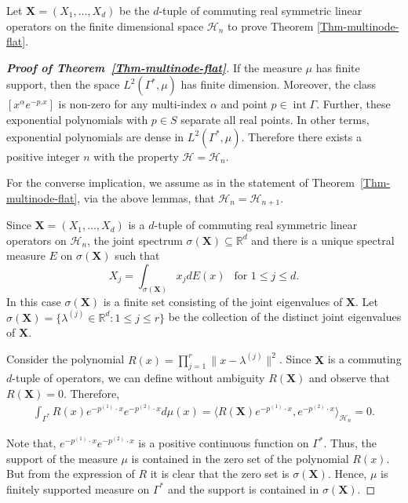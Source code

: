 \documentclass[11pt,reqno]{amsart}
\theoremstyle{plain}
\theoremstyle{definition}
\numberwithin{equation}{section}
\begin{document}
	Let $\mathbf{X}=(X_1, \dots, X_d)$ be the $d$-tuple of commuting real symmetric linear operators on the finite dimensional space $\mathcal{H}_n$ to prove Theorem \ref{Thm-multinode-flat}.
	
	\vspace{2mm}
	
	\begin{proof}[\textbf{Proof of Theorem~\ref{Thm-multinode-flat}}]
		
		If the measure $\mu$ has finite support, then the space $L^2(\Gamma^*, \mu)$ has finite dimension. Moreover, the class $[x^\alpha e^{-p.x}]$ is non-zero for any multi-index $\alpha$
		and point $p \in \operatorname{int} \Gamma$. Further, these exponential polynomials with $p \in S$ separate all real points. In other terms, exponential polynomials are dense in $L^2(\Gamma^\ast, \mu)$.
	Therefore there exists a positive integer $n$ with the property $\mathcal{H} = \mathcal{H}_n.$
          
		For the converse implication, we assume as in the statement of Theorem~\ref{Thm-multinode-flat}, via the above lemmas, that $\mathcal{H}_n = \mathcal{H}_{n+1}.$
		
		Since $\mathbf{X}=(X_1, \dots, X_d)$ is a $d$-tuple of commuting real symmetric linear operators on $\mathcal{H}_n$, the joint spectrum $\sigma(\mathbf{X}) \subseteq \mathbb{R}^d$ and there is a unique spectral measure $E$ on $\sigma(\mathbf{X})$ such that
		$$
		X_j = \int_{\sigma(\mathbf{X})} x_j dE(x) \ \ \text{ for } 1\leq j \leq d.
		$$
		In this case $\sigma(\mathbf{X})$ is a finite set consisting of the joint eigenvalues of $\mathbf{X}$. Let $\sigma(\mathbf{X})= \{\lambda^{(j)} \in \mathbb{R}^d: 1\leq j \leq r \}$ be the collection of the distinct joint eigenvalues of $\mathbf{X}$.
		
		
		Consider the polynomial $R(x) = \prod_{j=1}^r \|x-\lambda^{(j)}\|^2$. Since $\mathbf{X}$ is a commuting $d$-tuple of operators, we can define without ambiguity $R(\mathbf{X})$ and observe that $R(\mathbf{X}) = 0$. Therefore,
		\begin{align*}
			\int_{\Gamma^*} R(x) e^{-p^{(1)} \cdot x} e^{-p^{(2)} \cdot x} d\mu(x) = \langle R(\mathbf{X}) e^{-p^{(1)} \cdot x}, e^{-p^{(2)} \cdot x} \rangle_{\mathcal{H}_n} =0.
		\end{align*}
		
		Note that, $e^{-p^{(1)} \cdot x} e^{-p^{(2)} \cdot x}$ is a positive continuous function on $\Gamma^*$. Thus, the support of the measure $\mu$ is contained in the zero set of the polynomial $R(x)$. But from the expression of $R$ it is clear that the zero set is $\sigma(\mathbf{X})$.
		Hence, $\mu$ is finitely supported measure on $\Gamma^*$ and the support is contained in $\sigma(\mathbf{X})$. 
		
	\end{proof}
	
\end{document}
